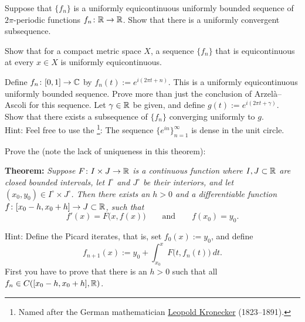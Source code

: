 \begin{exercise}
Suppose that $\{ f_n \}$ is a uniformly equicontinuous uniformly bounded sequence of
$2\pi$-periodic functions $f_n \colon {\mathbb{R}} \to {\mathbb{R}}$.  Show that there is a
uniformly convergent subsequence.
\end{exercise}

\begin{exercise}
Show that for a compact metric space $X$,
a sequence $\{ f_n \}$ that is equicontinuous at every $x \in X$
is uniformly equicontinuous.
\end{exercise}

\begin{exercise}
Define $f_n \colon [0,1] \to {\mathbb{C}}$ by $f_n(t) := e^{i(2\pi t + n)}$.
This is a uniformly equicontinuous uniformly bounded sequence.
Prove more than just
the conclusion of Arzel\`a--Ascoli for this sequence.  Let $\gamma \in {\mathbb{R}}$
be given,
and define $g(t) := e^{i(2\pi t + \gamma)}$.  Show that there exists 
a subsequence of $\{ f_n \}$ converging uniformly to $g$.
\\
Hint: Feel free to use the \emph{}\footnote{%
Named after the German mathematician
\href{http://en.wikipedia.org/wiki/Leopold_Kronecker}{Leopold Kronecker}
(1823--1891).}:
The sequence $\{ e^{in} \}_{n=1}^\infty$ is dense in the unit circle.
\end{exercise}

\begin{exercise} \label{exercise:peanoexistence}
Prove the \emph{} (note the lack of
uniqueness in this theorem):

\textbf{Theorem:} \emph{Suppose $F \colon I \times J \to {\mathbb{R}}$ is 
a continuous function where
$I, J \subset {\mathbb{R}}$ are closed bounded intervals, 
let $I^\circ$ and $J^\circ$ be their interiors,
and
let $(x_0,y_0) \in I^\circ \times J^\circ$.
Then there exists an $h > 0$ and a differentiable
function $f \colon [x_0 - h, x_0 + h] \to J \subset {\mathbb{R}}$, such that}
\begin{equation*}
f'(x) = F\bigl(x,f(x)\bigr) \qquad \text{and} \qquad f(x_0) = y_0.
\end{equation*}

Hint: Define the Picard iterates, that is,
set $f_0(x) := y_0$, and define
\begin{equation*} \label{picard:inteq}
f_{n+1}(x) := y_0 + \int_{x_0}^x F\bigl(t,f_n(t)\bigr)~dt .
\end{equation*}
First you have to prove that there is an $h > 0$ such that all $f_n \in C([x_0-h,x_0+h],{\mathbb{R}})$.
\end{exercise}

